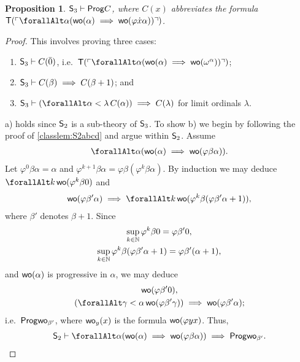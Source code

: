 \documentclass[UKenglish,cleveref,DIV=12]{scrartcl}
\let\forall\forallAlt
\newtheorem{proposition}[lemma]{Proposition}
\theoremstyle{definition}
\theoremstyle{definition}
\begin{document}
\begin{proposition}\label{extlem:S3wellord}
  $\mathsf{S}_3\vdash \mathsf{Prog} C$, where $C(x)$ abbreviates the formula $\T(\gn{\forall\alpha(\wo(\alpha)\implies
  \wo(\varphi\dot x\alpha))})$.
\end{proposition}
\begin{proof} This involves proving three cases:
\begin{enumerate}
 \item $\mathsf{S}_3\vdash C(\bar 0)$, i.e.~$\T(\gn{\forall\alpha(\wo(\alpha)\implies\wo(\omega^\alpha))})$;
 \item $\mathsf{S}_3\vdash C(\beta)\implies C(\beta+1)$; and
 \item $\theory S_3\proves (\forall\alpha<\lambda\,C(\alpha))\implies C(\lambda)$ for limit ordinals $\lambda$.
\end{enumerate}
a) holds since $\mathsf{S}_2$ is a sub-theory of $\mathsf{S}_3$.
%
To show b) we begin by following the proof of \cref{classlem:S2abcd} and argue within
$\mathsf{S}_2$. Assume
\begin{align*}%
 \forall\alpha(\wo(\alpha)\implies\wo(\varphi\beta\alpha)).
\end{align*}
Let $\varphi^0\beta\alpha=\alpha$ and $\varphi^{k+1}\beta\alpha=\varphi\beta(\varphi^k\beta\alpha)$.
By induction we may deduce $\forall k\,\wo(\varphi^k\beta0)$ and
\begin{align}\label{exteqn:S3wo2}
 \wo(\varphi\beta'\alpha)\implies\forall k\,\wo(\varphi^k\beta(\varphi\beta'\alpha+1)),
\end{align}
where $\beta'$ denotes $\beta+1$. Since
\begin{gather*}
  \sup_{k\in\mathbb N}\varphi^k\beta0=\varphi\beta'0,\\
  \sup_{k\in\mathbb N}\varphi^k\beta(\varphi\beta'\alpha+1)=\varphi\beta'(\alpha+1),
\end{gather*}
and $\mathsf{wo}(\alpha)$ is progressive in $\alpha$, we may deduce
\begin{gather*}
 \wo(\varphi\beta'0), \label{exteqn:S3wo3}\\
 (\forall\gamma<\alpha\,\wo(\varphi\beta'\gamma))\implies \wo(\varphi\beta'\alpha);\label{exteqn:S3wo4}
\end{gather*}
i.e.~$\mathsf{Prog} \mathsf{wo}_{\beta'}$, where $\mathsf{wo}_y(x)$ is the formula $\mathsf{wo}(\varphi y x)$. Thus,
\begin{align}\label{exteqn:S3wo6}
  \theory S_2\proves \forall \alpha(\wo(\alpha)\implies\wo(\varphi\beta\alpha))\implies \Prog\wo_{\beta'}.

\end{align}
\end{proof}
\end{document}
